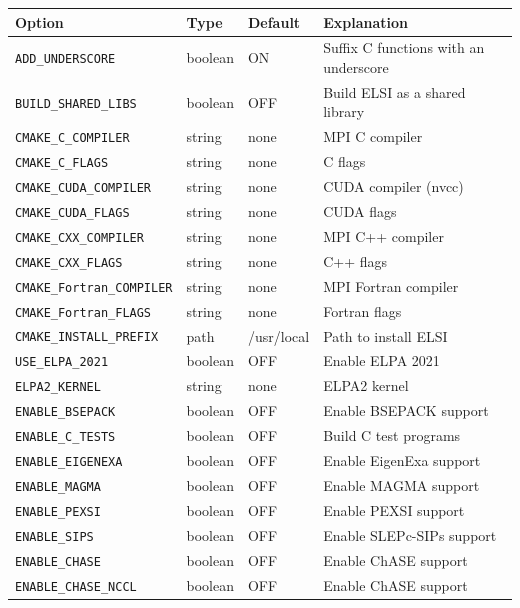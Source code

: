 \documentclass{report}
\begin{document}
\begin{longtable}[]{|p{40mm}|p{15mm}|p{20mm}|p{87mm}|}
\hline \multicolumn{1}{|l|}{\textbf{Option}}
& \multicolumn{1}{l|}{\textbf{Type}}
& \multicolumn{1}{l|}{\textbf{Default}}
& \multicolumn{1}{l|}{\textbf{Explanation}}\\
\hline \texttt{ADD\_UNDERSCORE} & boolean & ON & Suffix C functions with an
underscore\\
\hline \texttt{BUILD\_SHARED\_LIBS} & boolean & OFF & Build ELSI as
a shared library\\
\hline \texttt{CMAKE\_C\_COMPILER} & string & none & MPI C compiler\\
\hline \texttt{CMAKE\_C\_FLAGS} & string & none & C flags\\
\hline \texttt{CMAKE\_CUDA\_COMPILER} & string & none & CUDA compiler
(nvcc)\\
\hline \texttt{CMAKE\_CUDA\_FLAGS} & string & none & CUDA flags\\
\hline \texttt{CMAKE\_CXX\_COMPILER} & string & none & MPI C++ compiler\\
\hline \texttt{CMAKE\_CXX\_FLAGS} & string & none & C++ flags\\
\hline \texttt{CMAKE\_Fortran\_COMPILER} & string & none & MPI Fortran
compiler\\
\hline \texttt{CMAKE\_Fortran\_FLAGS} & string & none & Fortran flags\\
\hline \texttt{CMAKE\_INSTALL\_PREFIX} & path & /usr/local & Path to
install ELSI\\
\hline \texttt{USE\_ELPA\_2021} & boolean & OFF & Enable ELPA 2021\\
\hline \texttt{ELPA2\_KERNEL} & string & none & ELPA2 kernel\\
\hline \texttt{ENABLE\_BSEPACK} & boolean & OFF & Enable BSEPACK support\\
\hline \texttt{ENABLE\_C\_TESTS} & boolean & OFF & Build C test programs\\
\hline \texttt{ENABLE\_EIGENEXA} & boolean & OFF & Enable EigenExa
support\\
\hline \texttt{ENABLE\_MAGMA} & boolean & OFF & Enable MAGMA support\\
\hline \texttt{ENABLE\_PEXSI} & boolean & OFF & Enable PEXSI support\\
\hline \texttt{ENABLE\_SIPS} & boolean & OFF & Enable SLEPc-SIPs support\\
\hline \texttt{ENABLE\_CHASE} & boolean & OFF & Enable ChASE support\\
\hline \texttt{ENABLE\_CHASE\_NCCL} & boolean & OFF & Enable ChASE support

\end{longtable}
\end{document}
